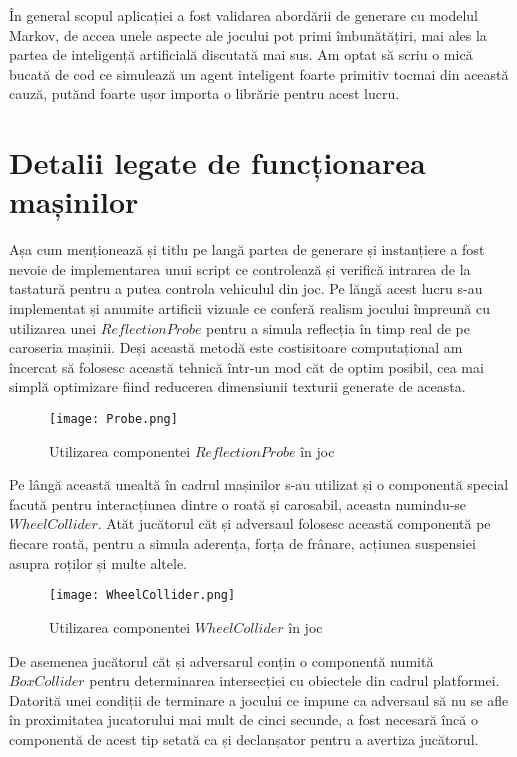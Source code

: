 În general scopul aplicației a fost validarea abordării de generare cu modelul Markov, de accea unele aspecte ale jocului pot primi îmbunătățiri, mai ales la partea de inteligență artificială discutată mai sus. Am optat să scriu o mică bucată de cod ce simulează un agent inteligent foarte primitiv tocmai din această cauză, putănd foarte ușor importa o librărie pentru acest lucru.\par

\section{Detalii legate de funcționarea mașinilor}

Așa cum menționează și titlu pe langă partea de generare și instanțiere a fost nevoie de implementarea unui script ce controlează și verifică intrarea de la tastatură pentru a putea controla vehiculul din joc. Pe lăngă acest lucru s-au implementat și anumite artificii vizuale ce conferă realism jocului împreună cu utilizarea unei $ReflectionProbe$ pentru a simula reflecția în timp real de pe caroseria mașinii. Deși această metodă este costisitoare computațional am încercat să folosesc această tehnică într-un mod căt de optim posibil, cea mai simplă optimizare fiind reducerea dimensiunii texturii generate de aceasta.\par

\vspace{10mm}
\begin{figure}[H]
\centering
\texttt{[image: Probe.png]} \par
\caption{Utilizarea componentei $ReflectionProbe$ în joc}
\end{figure}

Pe lângă această unealtă în cadrul mașinilor s-au utilizat și o componentă special facută pentru interacțiunea dintre o roată și carosabil, aceasta numindu-se $WheelCollider$. Atăt jucătorul căt și adversaul folosesc această componentă pe fiecare roată, pentru a simula aderența, forța de frânare, acțiunea suspensiei asupra roților și multe altele.\par

\begin{figure}[H]
\centering
\texttt{[image: WheelCollider.png]} \par
\caption{Utilizarea componentei $WheelCollider$ în joc}
\end{figure}

De asemenea jucătorul căt și adversarul conțin o componentă numită $BoxCollider$ pentru determinarea intersecției cu obiectele din cadrul platformei. Datorită unei condiții de terminare a jocului ce impune ca adversaul să nu se afle în proximitatea jucatorului mai mult de cinci secunde, a fost necesară încă o componentă de acest tip setată ca și declanșator pentru a avertiza jucătorul.\par

